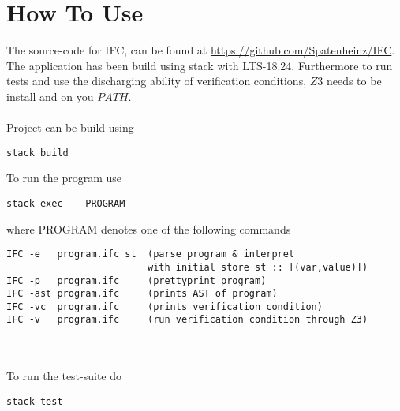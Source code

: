 \section{How To Use}\label{sec:guide}
The source-code for IFC, can be found at \url{https://github.com/Spatenheinz/IFC}. The application has been build using stack with LTS-18.24.
Furthermore to run tests and use the discharging ability of verification conditions, $Z3$ needs to be install and on you $PATH$.
\\~\\
Project can be build using
\begin{verbatim}
stack build
\end{verbatim}

To run the program use
\begin{verbatim}
stack exec -- PROGRAM
\end{verbatim}
where PROGRAM denotes one of the following commands
\begin{verbatim}
IFC -e   program.ifc st  (parse program & interpret
                         with initial store st :: [(var,value)])
IFC -p   program.ifc     (prettyprint program)
IFC -ast program.ifc     (prints AST of program)
IFC -vc  program.ifc     (prints verification condition)
IFC -v   program.ifc     (run verification condition through Z3)
\end{verbatim}
\\~\\
To run the test-suite do
\begin{verbatim}
stack test
\end{verbatim}
